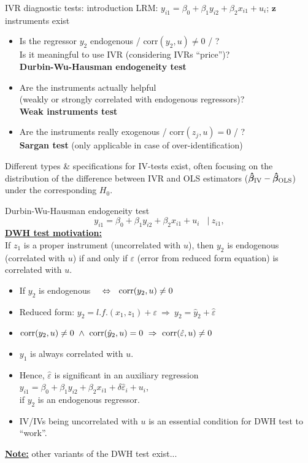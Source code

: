 \documentclass[usenames,dvipsnames]{beamer}
\begin{document}
\begin{frame}{IVR diagnostic tests: introduction}
LRM: $y_{i1}=\beta_0+\beta_1 y_{i2}+\beta_2 x_{i1}+u_i$; \quad $\bm{z}$ instruments exist
\medskip
\begin{itemize}
\item Is the regressor $y_2$ endogenous / $\mathrm{corr}(y_2, u) \neq 0$ / ? \\
Is it meaningful to use IVR (considering IVRs ``price'')?\\
\textbf{Durbin-Wu-Hausman endogeneity test}\\
\item Are the instruments actually helpful\\
(weakly or strongly correlated with endogenous regressors)? \\
\textbf{Weak instruments test}\\
\item Are the instruments really exogenous / $\mathrm{corr}(z_j, u)=0$ / ?\\
\textbf{Sargan test} (only applicable in case of over-identification)\\
\end{itemize}
\medskip
\small Different types \& specifications for IV-tests exist, often focusing on the distribution of the difference between IVR and OLS estimators ($\bm{\hat{\beta}}_{\textnormal{IV}}-\bm{\hat{\beta}}_{\textnormal{OLS}}$) under the corresponding $H_0$.
\end{frame}
\begin{frame}{Durbin-Wu-Hausman endogeneity test}
\small 
$$y_{i1}=\beta_0+\beta_1 y_{i2} + \beta_2 x_{i1} +  u_i ~~~~|~z_{i1}, $$
\medskip
\textbf{\underline{DWH test motivation:}} \\If $z_1$ is a proper instrument (uncorrelated with $u$), then $y_2$ is endogenous (correlated with $u$) if and only if $\varepsilon$ (error from reduced form equation) is correlated with $u$. \\
\medskip
\begin{itemize}
\item If $y_2$ is endogenous ~~$\Leftrightarrow ~~\textnormal{corr}(y_2,u)\neq0$
\item Reduced form: $y_2 = \textit{l.f.}(x_1, z_1) + \varepsilon ~\Rightarrow~ y_2 = \hat{y}_2 + \hat{\varepsilon}$
\item $\textnormal{corr}(y_2,u)\neq0 ~\wedge~\textnormal{corr}(\hat{y}_2,u) = 0 ~\Rightarrow~ \textnormal{corr}(\hat{\varepsilon},u)\neq0 $
\item $y_1$ is always correlated with $u$. 
\item Hence, $\hat{\varepsilon}$ is significant in an auxiliary regression\\ \smallskip
$y_{i1}=\beta_0+\beta_1 y_{i2} + \beta_2 x_{i1} + \delta \hat{\varepsilon}_i + u_i$, \\ \smallskip if $y_2$ is an endogenous regressor.
\item IV/IVs being uncorrelated with $u$ is an essential condition for DWH test to ``work''.
\end{itemize}
\medskip
\textbf{\underline{Note:}} other variants of the DWH test exist...
\end{frame}
\end{document}
